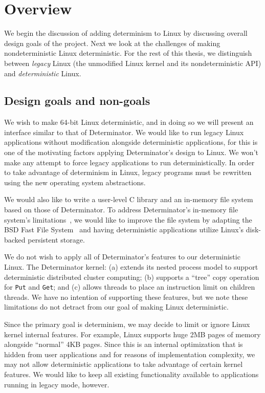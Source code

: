 
\section{Overview}
\label{sec:overview}

We begin the discussion of adding determinism to Linux by discussing overall
design goals of the project. Next we look at the challenges of making
nondeterministic Linux deterministic. For the rest of this thesis, we
distinguish between \emph{legacy} Linux (the unmodified Linux kernel and its
nondeterministic API) and \emph{deterministic} Linux.

\subsection{Design goals and non-goals}

We wish to make 64-bit Linux deterministic, and in doing so we will present an
interface similar to that of Determinator. We would like to run legacy
Linux applications without modification alongside deterministic applications,
for this is one of the motivating factors applying Determinator's design to
Linux. We won't make any attempt to force legacy applications to run
deterministically. In order to take advantage of determinism in
Linux, legacy programs must be rewritten using the new operating system
abstractions.

We would also like to write a user-level C library and an in-memory file system
based on those of Determinator.
To address Determinator's in-memory file system's limitations~\cite{Aviram10,
Aviram10cloud}, we would like to improve the file system by adapting
the BSD Fast File System~\cite{mckusick1984fast} and having deterministic
applications utilize Linux's disk-backed persistent storage.

We do not wish to apply all of Determinator's features to our deterministic
Linux. The Determinator kernel: (a) extends its nested process model to support
deterministic distributed cluster computing; (b) supports a ``tree'' copy
operation for {\tt Put} and {\tt Get}; and (c) allows
threads to place an instruction limit on
children threads. We have no intention of supporting these features, but we note
these limitations do not detract from our goal of making Linux deterministic.

Since the primary goal is determinism, we may decide to limit or ignore Linux
kernel internal features. For example, Linux supports huge 2MB pages of memory
alongside ``normal'' 4KB pages. Since this is an internal optimization that is
hidden from user applications and for reasons of
implementation complexity, we may not allow deterministic applications to take
advantage of certain kernel features. We would like to keep all existing
functionality available to applications running in legacy mode, however.

